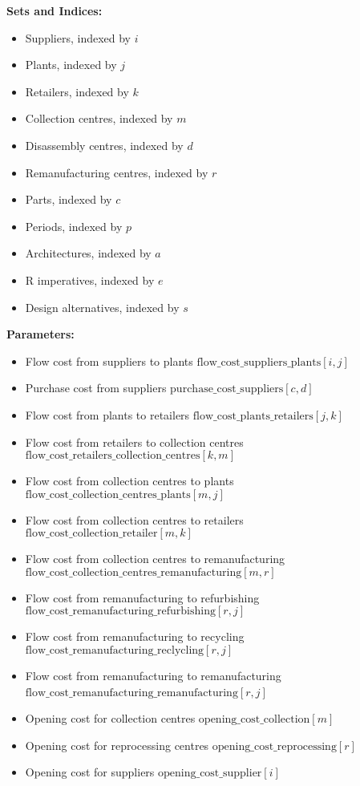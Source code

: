\documentclass{article}
\begin{document}
    \textbf{Sets and Indices:}
    \begin{itemize}
        \item Suppliers, indexed by \( i \)
        \item Plants, indexed by \( j \)
        \item Retailers, indexed by \( k \)
        \item Collection centres, indexed by \( m \)
        \item Disassembly centres, indexed by \( d \)
        \item Remanufacturing centres, indexed by \( r \)
        \item Parts, indexed by \( c \)
        \item Periods, indexed by \( p \)
        \item Architectures, indexed by \( a \)
        \item R imperatives, indexed by \( e \)
        \item Design alternatives, indexed by \( s \)
        \\
    \end{itemize}

    \textbf{Parameters:}
    \begin{itemize}
        \item Flow cost from suppliers to plants \( \text{flow\_cost\_suppliers\_plants}[i,j] \)
        \item Purchase cost from suppliers \( \text{purchase\_cost\_suppliers}[c,d] \)
        \item Flow cost from plants to retailers \( \text{flow\_cost\_plants\_retailers}[j,k] \)
        \item Flow cost from retailers to collection centres \( \text{flow\_cost\_retailers\_collection\_centres}[k,m] \)
        \item Flow cost from collection centres to plants \( \text{flow\_cost\_collection\_centres\_plants}[m,j] \)
        \item Flow cost from collection centres to retailers \( \text{flow\_cost\_collection\_retailer}[m,k] \)
        \item Flow cost from collection centres to remanufacturing \( \text{flow\_cost\_collection\_centres\_remanufacturing}[m,r] \)
        \item Flow cost from remanufacturing to refurbishing \( \text{flow\_cost\_remanufacturing\_refurbishing}[r,j] \)
        \item Flow cost from remanufacturing to recycling \( \text{flow\_cost\_remanufacturing\_reclycling}[r,j] \)
        \item Flow cost from remanufacturing to remanufacturing \( \text{flow\_cost\_remanufacturing\_remanufacturing}[r,j] \)
        \
        \item Opening cost for collection centres \( \text{opening\_cost\_collection}[m] \)
        \item Opening cost for reprocessing centres \( \text{opening\_cost\_reprocessing}[r] \)
        \item Opening cost for suppliers \( \text{opening\_cost\_supplier}[i] \)
        \\
    \end{itemize}
\end{document}
